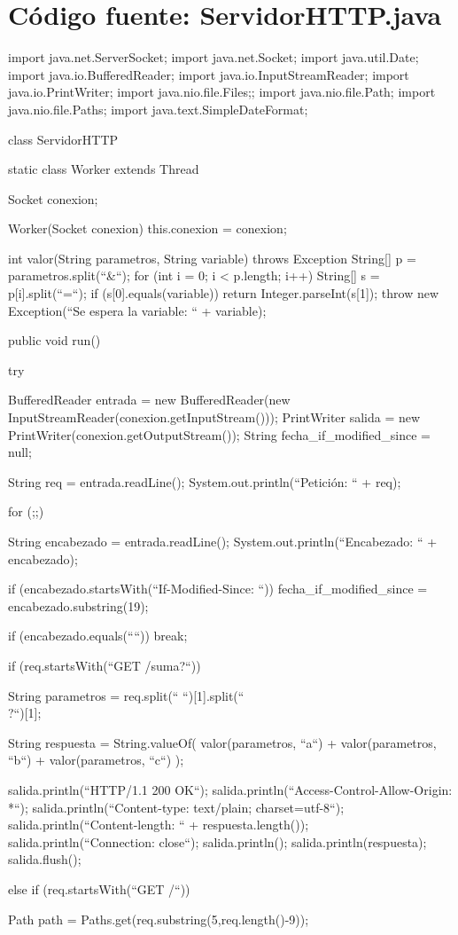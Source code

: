 \chapter{Código fuente: ServidorHTTP.java}
\begin{SourceCode}
import java.net.ServerSocket;
import java.net.Socket;
import java.util.Date;
import java.io.BufferedReader;
import java.io.InputStreamReader;
import java.io.PrintWriter;
import java.nio.file.Files;;
import java.nio.file.Path;
import java.nio.file.Paths;
import java.text.SimpleDateFormat;

class ServidorHTTP
{
  static class Worker extends Thread
  {
    Socket conexion;

    Worker(Socket conexion)
    {
      this.conexion = conexion;
    }

    int valor(String parametros, String variable) throws Exception
    {
      String[] p = parametros.split(``&``);
      for (int i = 0; i < p.length; i++)
      {
        String[] s = p[i].split(``=``);
        if (s[0].equals(variable))
          return Integer.parseInt(s[1]);
      }
      throw new Exception(``Se espera la variable: `` + variable);
    }

    public void run()
    {
      try
      {
        BufferedReader entrada = new BufferedReader(new InputStreamReader(conexion.getInputStream()));
        PrintWriter salida = new PrintWriter(conexion.getOutputStream());
	      String fecha_if_modified_since = null;

        String req = entrada.readLine();
        System.out.println(``Petición: `` + req);

        for (;;)
        {
          String encabezado = entrada.readLine();
          System.out.println(``Encabezado: `` + encabezado);

          if (encabezado.startsWith(``If-Modified-Since: ``))
	          fecha_if_modified_since = encabezado.substring(19);

          if (encabezado.equals(````)) break;
        }

        if (req.startsWith(``GET /suma?``))
        {
          String parametros = req.split(`` ``)[1].split(``\\?``)[1];

          String respuesta = String.valueOf(
            valor(parametros, ``a``) +
            valor(parametros, ``b``) +
            valor(parametros, ``c``)
          );

          salida.println(``HTTP/1.1 200 OK``);
          salida.println(``Access-Control-Allow-Origin: *``);
          salida.println(``Content-type: text/plain; charset=utf-8``);
          salida.println(``Content-length: `` + respuesta.length());
          salida.println(``Connection: close``);
          salida.println();
          salida.println(respuesta);
          salida.flush();
        }
	      else if (req.startsWith(``GET /``))
        {
	        Path path = Paths.get(req.substring(5,req.length()-9));

}}}}}
\end{SourceCode}
